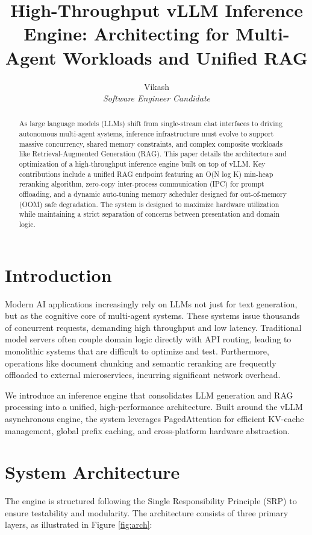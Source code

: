 \documentclass[10pt,twocolumn,letterpaper]{article}
\title{\Large \bf High-Throughput vLLM Inference Engine: Architecting for Multi-Agent Workloads and Unified RAG}
\author{
Vikash \\
\textit{Software Engineer Candidate}
}
\date{}
\begin{document}
\maketitle

\begin{abstract}
As large language models (LLMs) shift from single-stream chat interfaces to driving autonomous multi-agent systems, inference infrastructure must evolve to support massive concurrency, shared memory constraints, and complex composite workloads like Retrieval-Augmented Generation (RAG). This paper details the architecture and optimization of a high-throughput inference engine built on top of vLLM. Key contributions include a unified RAG endpoint featuring an O(N log K) min-heap reranking algorithm, zero-copy inter-process communication (IPC) for prompt offloading, and a dynamic auto-tuning memory scheduler designed for out-of-memory (OOM) safe degradation. The system is designed to maximize hardware utilization while maintaining a strict separation of concerns between presentation and domain logic.
\end{abstract}

\section{Introduction}
Modern AI applications increasingly rely on LLMs not just for text generation, but as the cognitive core of multi-agent systems. These systems issue thousands of concurrent requests, demanding high throughput and low latency. Traditional model servers often couple domain logic directly with API routing, leading to monolithic systems that are difficult to optimize and test. Furthermore, operations like document chunking and semantic reranking are frequently offloaded to external microservices, incurring significant network overhead. 

We introduce an inference engine that consolidates LLM generation and RAG processing into a unified, high-performance architecture. Built around the vLLM asynchronous engine, the system leverages PagedAttention for efficient KV-cache management, global prefix caching, and cross-platform hardware abstraction.

\section{System Architecture}

The engine is structured following the Single Responsibility Principle (SRP) to ensure testability and modularity. The architecture consists of three primary layers, as illustrated in Figure \ref{fig:arch}:
\end{document}

